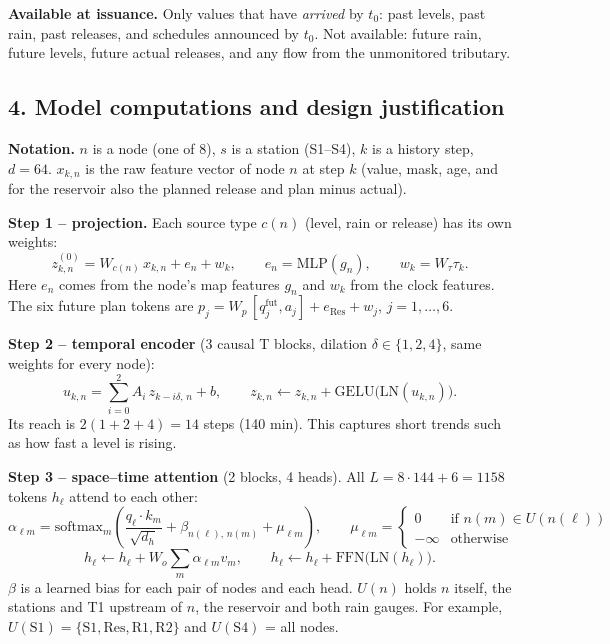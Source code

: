 \documentclass[11pt,a4paper]{article}
\begin{document}
\textbf{Available at issuance.} Only values that have \emph{arrived} by $t_0$: past levels, past rain, past releases, and schedules announced by $t_0$. Not available: future rain, future levels, future actual releases, and any flow from the unmonitored tributary.

\subsection*{4. Model computations and design justification}

\textbf{Notation.} $n$ is a node (one of 8), $s$ is a station (S1--S4), $k$ is a history step, $d=64$. $x_{k,n}$ is the raw feature vector of node $n$ at step $k$ (value, mask, age, and for the reservoir also the planned release and plan minus actual).

\textbf{Step 1 -- projection.} Each source type $c(n)$ (level, rain or release) has its own weights:
\[
  z^{(0)}_{k,n} = W_{c(n)}\, x_{k,n} + e_n + w_k, \qquad e_n = \mathrm{MLP}(g_n), \qquad w_k = W_\tau \tau_k .
\]
Here $e_n$ comes from the node's map features $g_n$ and $w_k$ from the clock features. The six future plan tokens are $p_j = W_p\,[q^{\text{fut}}_j, a_j] + e_{\text{Res}} + w_j$, $j=1,\dots,6$.

\textbf{Step 2 -- temporal encoder} (3 causal T blocks, dilation $\delta\in\{1,2,4\}$, same weights for every node):
\[
  u_{k,n} = \sum_{i=0}^{2} A_i\, z_{k-i\delta,\,n} + b, \qquad z_{k,n} \leftarrow z_{k,n} + \mathrm{GELU}\big(\mathrm{LN}(u_{k,n})\big).
\]
Its reach is $2(1+2+4)=14$ steps (140 min). This captures short trends such as how fast a level is rising.

\textbf{Step 3 -- space--time attention} (2 blocks, 4 heads). All $L = 8\cdot 144 + 6 = 1158$ tokens $h_\ell$ attend to each other:
\[
  \alpha_{\ell m} = \mathrm{softmax}_m\!\left( \frac{q_\ell \cdot k_m}{\sqrt{d_h}} + \beta_{n(\ell),\,n(m)} + \mu_{\ell m} \right), \qquad
  \mu_{\ell m} = \begin{cases} 0 & \text{if } n(m) \in U(n(\ell)) \\ -\infty & \text{otherwise} \end{cases}
\]
\[
  h_\ell \leftarrow h_\ell + W_o \sum_m \alpha_{\ell m} v_m, \qquad h_\ell \leftarrow h_\ell + \mathrm{FFN}\big(\mathrm{LN}(h_\ell)\big).
\]
$\beta$ is a learned bias for each pair of nodes and each head. $U(n)$ holds $n$ itself, the stations and T1 upstream of $n$, the reservoir and both rain gauges. For example, $U(\text{S1}) = \{\text{S1}, \text{Res}, \text{R1}, \text{R2}\}$ and $U(\text{S4})$ = all nodes.
\end{document}
